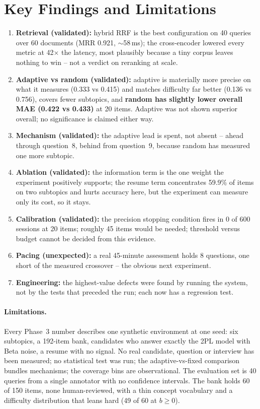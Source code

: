 \documentclass{tietreport}
\begin{document}
\section{Key Findings and Limitations}

\begin{enumerate}
  \item \textbf{Retrieval (validated):} hybrid RRF is the best configuration on 40 queries over
    60 documents (MRR 0.921, $\sim$58\,ms); the cross-encoder lowered every metric at 42$\times$
    the latency, most plausibly because a tiny corpus leaves nothing to win -- not a verdict on
    reranking at scale.
  \item \textbf{Adaptive vs random (validated):} adaptive is materially more precise on what it
    measures (0.333 vs 0.415) and matches difficulty far better (0.136 vs 0.756), covers fewer
    subtopics, and \textbf{random has slightly lower overall MAE (0.422 vs 0.433)} at 20 items.
    Adaptive was not shown superior overall; no significance is claimed either way.
  \item \textbf{Mechanism (validated):} the adaptive lead is spent, not absent -- ahead through
    question~8, behind from question~9, because random has measured one more subtopic.
  \item \textbf{Ablation (validated):} the information term is the one weight the experiment
    positively supports; the resume term concentrates 59.9\% of items on two subtopics and hurts
    accuracy here, but the experiment can measure only its cost, so it stays.
  \item \textbf{Calibration (validated):} the precision stopping condition fires in 0 of 600
    sessions at 20 items; roughly 45 items would be needed; threshold versus budget cannot be
    decided from this evidence.
  \item \textbf{Pacing (unexpected):} a real 45-minute assessment holds 8 questions, one short
    of the measured crossover -- the obvious next experiment.
  \item \textbf{Engineering:} the highest-value defects were found by running the system, not by
    the tests that preceded the run; each now has a regression test.
\end{enumerate}

\paragraph{Limitations.} Every Phase~3 number describes one synthetic environment at one seed:
six subtopics, a 192-item bank, candidates who answer exactly the 2PL model with Beta noise, a
resume with no signal. No real candidate, question or interview has been measured; no
statistical test was run; the adaptive-vs-fixed comparison bundles mechanisms; the coverage
bins are observational. The evaluation set is 40 queries from a single annotator with no
confidence intervals. The bank holds 60 of 150 items, none human-reviewed, with a thin concept
vocabulary and a difficulty distribution that leans hard (49 of 60 at $b\ge0$).
\end{document}
